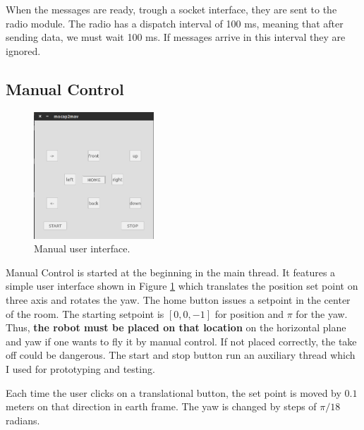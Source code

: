When the messages are ready, trough a socket interface, they are sent to the radio module. The radio has a dispatch interval of 100 ms, meaning that after sending data, we must wait 100 ms. If messages arrive in this interval they are ignored. 

\subsection{Manual Control}

\begin{figure}[h]
\centering
 \includegraphics[width=0.4\textwidth]{mangui.png}
 \caption{Manual user interface.}
 \label{figure:mangui}
\end{figure}

Manual Control is started at the beginning in the main thread. It features a simple user interface shown in Figure \ref{figure:mangui} which translates the position set point on three axis and rotates the yaw. The home button issues a setpoint in the center of the room. The starting setpoint is $[0,0,-1]$ for position and $\pi$ for the yaw. Thus, \textbf{the robot must be placed on that location} on the horizontal plane and yaw if one wants to fly it by manual control. If not placed correctly, the take off could be dangerous. The start and stop button run an auxiliary thread which I used for prototyping and testing. 

Each time the user clicks on a translational button, the set point is moved by $0.1$ meters on that direction in earth frame. The yaw is changed by steps of $\pi/18$ radians.


